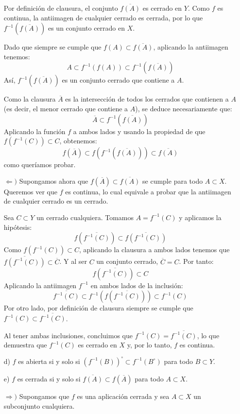 \begin{ejer}
\begin{itemize}
\begin{sol}
    Por definición de clausura, el conjunto $\overline{f(A)}$ es cerrado en $Y$. Como $f$ es continua, la antiimagen de cualquier cerrado es cerrada, por lo que $f^{-1}(\overline{f(A)})$ es un conjunto cerrado en $X$.
    
    Dado que siempre se cumple que $f(A) \subset \overline{f(A)}$, aplicando la antiimagen tenemos:
    \[
        A \subset f^{-1}(f(A)) \subset f^{-1}(\overline{f(A)})
    \]
    Así, $f^{-1}(\overline{f(A)})$ es un conjunto cerrado que contiene a $A$.
    
    Como la clausura $\overline{A}$ es la intersección de todos los cerrados que contienen a $A$ (es decir, el menor cerrado que contiene a $A$), se deduce necesariamente que:
    \[
        \overline{A} \subset f^{-1}(\overline{f(A)})
    \]
    Aplicando la función $f$ a ambos lados y usando la propiedad de que $f(f^{-1}(C)) \subset C$, obtenemos:
    \[
        f(\overline{A}) \subset f\left(f^{-1}(\overline{f(A)})\right) \subset \overline{f(A)}
    \]
    como queríamos probar.

    \medskip

    $\Leftarrow)$ Supongamos ahora que $f(\overline{A}) \subset \overline{f(A)}$ se cumple para todo $A \subset X$. Queremos ver que $f$ es continua, lo cual equivale a probar que la antiimagen de cualquier cerrado es un cerrado.
    
    Sea $C \subset Y$ un cerrado cualquiera. Tomamos $A = f^{-1}(C)$ y aplicamos la hipótesis:
    \[
        f(\overline{f^{-1}(C)}) \subset \overline{f(f^{-1}(C))}
    \]
    Como $f(f^{-1}(C)) \subset C$, aplicando la clausura a ambos lados tenemos que $\overline{f(f^{-1}(C))} \subset \overline{C}$. Y al ser $C$ un conjunto cerrado, $\overline{C} = C$. Por tanto:
    \[
        f(\overline{f^{-1}(C)}) \subset C
    \]
    Aplicando la antiimagen $f^{-1}$ en ambos lados de la inclusión:
    \[
        \overline{f^{-1}(C)} \subset f^{-1}\left(f(\overline{f^{-1}(C)})\right) \subset f^{-1}(C)
    \]
    Por otro lado, por definición de clausura siempre se cumple que $f^{-1}(C) \subset \overline{f^{-1}(C)}$.
    
    Al tener ambas inclusiones, concluimos que $f^{-1}(C) = \overline{f^{-1}(C)}$, lo que demuestra que $f^{-1}(C)$ es cerrado en $X$ y, por lo tanto, $f$ es continua.
\end{sol}
        \item[d)] $f$ es abierta si y solo si $\left(f^{-1}(B)\right)^{\circ} \subset f^{-1} (B^{\circ})$ para todo $B\subset Y$. 
        \item[e)] $f$ es cerrada si y solo si $\overline{f(A)}\subset f (\overline{A}) $ para todo $A \subset X$.
        \begin{sol}
    $\Rightarrow)$ Supongamos que $f$ es una aplicación cerrada y sea $A \subset X$ un subconjunto cualquiera.
    

\end{sol}
\end{itemize}
\end{ejer}

